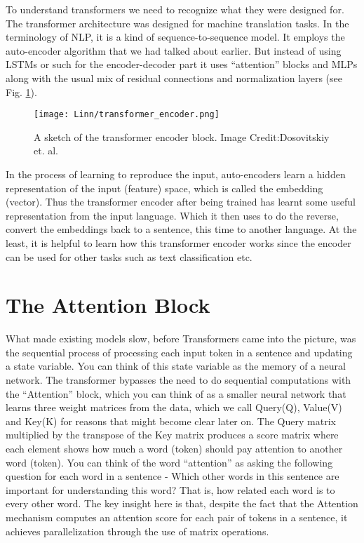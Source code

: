 \documentclass{../template/texnote}
\begin{document}
To understand transformers we need to recognize what they were designed for. 
The transformer architecture was designed for machine translation tasks.
In the terminology of NLP, it is a kind of sequence-to-sequence model.
It employs the auto-encoder algorithm that we had talked about earlier.
But instead of using LSTMs or such for the encoder-decoder part it uses ``attention'' blocks and MLPs along with the usual mix of residual connections and normalization layers (see Fig. \ref{fig:encoder}).
\begin{figure}
    \centering
    \texttt{[image: Linn/transformer\_encoder.png]}
    \caption{A sketch of the transformer encoder block. Image Credit:Dosovitskiy et. al.}
    \label{fig:encoder}
\end{figure}
In the process of learning to reproduce the input, auto-encoders learn a hidden representation of the input (feature) space, which is called the embedding (vector).
Thus the transformer encoder after being trained has learnt some useful representation from the input language.
Which it then uses to do the reverse, convert the embeddings back to a sentence, this time to another language.
At the least, it is helpful to learn how this transformer encoder works since the encoder can be used for other tasks such as text classification etc.

\section{The Attention Block}
What made existing models slow, before Transformers came into the picture, was the sequential process of processing each input token in a sentence and updating 
a state variable. You can think of this state variable as the memory of a neural network. 
The transformer bypasses the need to do sequential computations with the ``Attention'' block, which you can think of as a smaller neural network that learns three weight matrices from the data, which we call
Query(Q), Value(V) and Key(K) for reasons that might become clear later on.
The Query matrix multiplied by the transpose of the Key matrix produces a score matrix where each element shows how much a word (token) should pay attention to another word (token).
You can think of the word ``attention'' as asking the following question for each word in a sentence - 
Which other words in this sentence are important for understanding this word? 
That is,  how related each word is to every other word.
The key insight here is that, despite the fact that the Attention mechanism computes an attention score for each pair of tokens in a sentence, it achieves parallelization through the use of
matrix operations.
\end{document}
